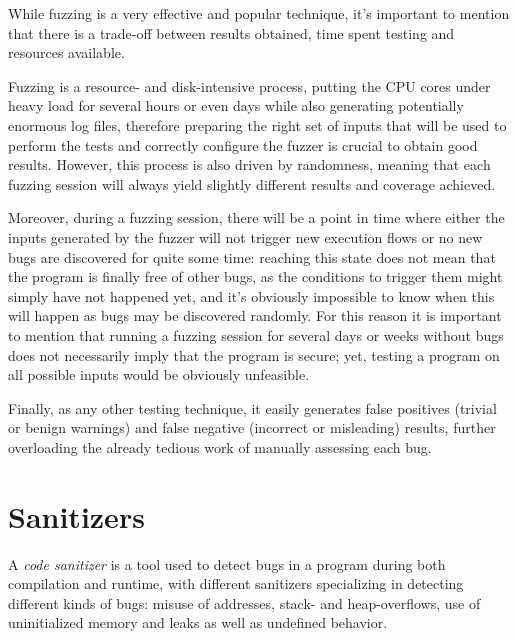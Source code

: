 While fuzzing is a very effective and popular technique, it's important to mention that there is a trade-off between results obtained, time spent testing and resources available.

Fuzzing is a resource- and disk-intensive process, putting the CPU cores under heavy load for several hours or even days while also generating potentially enormous log files, therefore preparing the right set of inputs that will be used to perform the tests and correctly configure the fuzzer is crucial to obtain good results.
However, this process is also driven by randomness, meaning that each fuzzing session will always yield slightly different results and coverage achieved. 

Moreover, during a fuzzing session, there will be a point in time where either the inputs generated by the fuzzer will not trigger new execution flows or no new bugs are discovered for quite some time: reaching this state does not mean that the program is finally free of other bugs, as the conditions to trigger them might simply have not happened yet, and it's obviously impossible to know when this will happen as bugs may be discovered randomly. For this reason it is important to mention that running a fuzzing session for several days or weeks without bugs does not necessarily imply that the program is secure; yet, testing a program on all possible inputs would be obviously unfeasible.

Finally, as any other testing technique, it easily generates false positives (trivial or benign warnings) and false negative (incorrect or misleading) results, further overloading the already tedious work of manually assessing each bug.




\newpage
\section{Sanitizers} \label{sanitizers}
A \textit{code sanitizer} is a tool used to detect bugs in a program during both compilation and runtime, with different sanitizers specializing in detecting different kinds of bugs: misuse of addresses, stack- and heap-overflows, use of uninitialized memory and leaks as well as undefined behavior.


